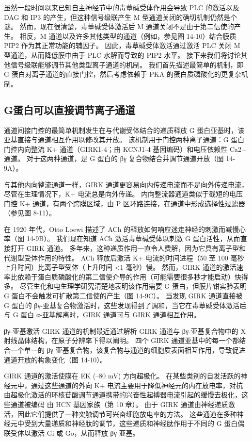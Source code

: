 虽然一段时间以来已知自主神经节中的毒蕈碱受体作用会导致 PLC 的激活以及 DAG 和 IP3 的产生，但这种信号级联产生 M 型通道关闭的确切机制仍然是个谜。 然而，现在很清楚，毒蕈碱受体激活后 M 通道关闭不是由于第二信使的产生。 相反，M 通道以及许多其他类型的通道（例如，参见图 14-10）结合膜质 PIP2 作为其正常功能的辅因子。 因此，毒蕈碱受体激活通过激活 PLC 关闭 M 型通道，从而降低膜中由于 PLC 水解而导致的 PIP2 水平。 接下来我们将讨论其他信号级联能够调节其他类型离子通道的机制。 我们首先描述最简单的机制，即 G 蛋白对离子通道的直接门控，然后考虑依赖于 PKA 的蛋白质磷酸化的更复杂机制。

\subsection{G蛋白可以直接调节离子通道}
通道间接门控的最简单机制发生在与代谢受体结合的递质释放 G 蛋白亚基时，该亚基直接与通道相互作用以修改其开放。 该机制用于门控两种离子通道：G 蛋白门控内向整流 K+ 通道（GIRK1-4；由 KCNJ1-4 基因编码）和电压依赖性 Ca2+ 通道。 对于这两种通道，是 G 蛋白的 βγ 复合物结合并调节通道开放（图 14-9A）。

与其他内向整流通道一样，GIRK 通道更容易向内传递电流而不是向外传递电流，尽管在生理情况下，K+ 电流总是向外传递。 内向整流器通道类似于截短的电压门控 K+ 通道，有两个跨膜区域，由 P 区环路连接，在通道中形成选择性过滤器（参见图 8-11）。

在 1920 年代，Otto Loewi 描述了 ACh 的释放如何响应迷走神经的刺激而减慢心率（图 14-9B）。 我们现在知道 ACh 激活毒蕈碱受体以刺激 G 蛋白活性，从而直接打开 GIRK 通道。 多年来，这种递质作用一直令人费解，因为它具有离子型和代谢型受体作用的特性。 ACh 释放后激活 K+ 电流的时间进程（50 至 100 毫秒上升时间）比离子型受体（上升时间 <1 毫秒）慢。 然而，GIRK 通道的激活速率比依赖于蛋白质磷酸化的第二信使介导的作用（可能需要很多秒才能启动）快得多。 尽管生化和电生理学研究清楚地表明该作用需要 G 蛋白，但膜片钳实验表明 G 蛋白不会触发可扩散第二信使的产生（图 14-9C）。 当发现 GIRK 通道直接被 G 蛋白的 βγ-亚基复合物激活时，这些发现得到了调和，当它在毒蕈碱受体激活后与 G 蛋白 α-亚基解离时，GIRK 通道可与 GIRK 通道相互作用。

βγ-亚基激活 GIRK 通道的机制最近通过解析 GIRK 通道与 βγ-亚基复合物中的 X 射线晶体结构，在原子分辨率下得以阐明。 四个 GIRK 通道亚基中的每一个都结合一个单一的 βγ-亚基复合物，该复合物与通道的细胞质表面相互作用，导致促进通道开放的构象变化（图 14-10）。

GIRK 通道的激活使膜在 EK (–80 mV) 方向超极化。 在某些类别的自发活跃的神经元中，通过这些通道的外向 K+ 电流主要用于降低神经元的内在放电率，对抗由超极化激活的环核苷酸调节通道携带的兴奋性起搏器电流引起的缓慢去极化，这些通道被编码 由 HCN 基因家族（第 10 章）。 由于 GIRK 通道由神经递质激活，因此它们提供了一种突触调节可兴奋细胞放电率的方法。 这些通道在多种神经元中受到大量递质和神经肽的调节，这些递质和神经肽作用于不同的 G 蛋白偶联受体以激活 Gi 或 Go，从而释放 βγ 亚基。


